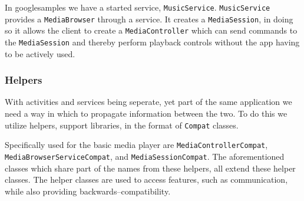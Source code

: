 In googlesamples we have a started service, \texttt{MusicService}.
\texttt{MusicService} provides a \texttt{MediaBrowser} through a service.
It creates a \texttt{MediaSession}, in doing so it allows the client to create a \texttt{MediaController} which can send commands to the \texttt{MediaSession} and thereby perform playback controls without the app having to be actively used.


\subsubsection{Helpers}
With activities and services being seperate, yet part of the same application we need a way in which to propagate information between the two.
To do this we utilize helpers, support libraries, in the format of \texttt{Compat} classes.

Specifically used for the basic media player are \texttt{MediaControllerCompat}, \texttt{MediaBrowserServiceCompat}, and \texttt{MediaSessionCompat}.
The aforementioned classes which share part of the names from these helpers, all extend these helper classes.
The helper classes are used to access features, such as communication, while also providing backwards--compatibility.




